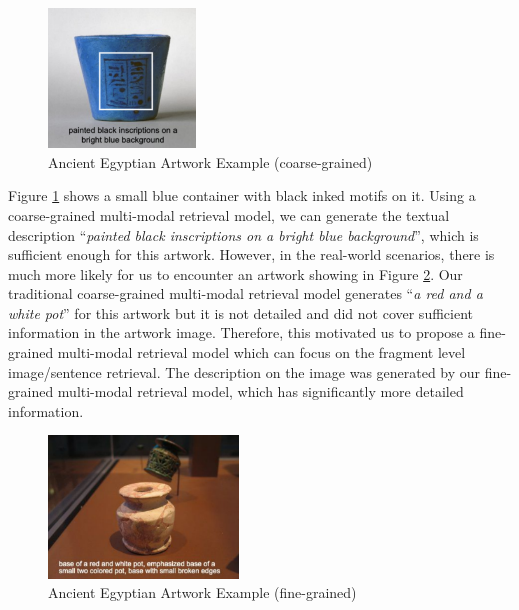 \begin{figure}[h!]
\centering
\includegraphics[width=0.35\textwidth]{artwork_fine1.pdf}
\caption{Ancient Egyptian Artwork Example (coarse-grained)}
\label{fig:artwork1}
\end{figure}

Figure \ref{fig:artwork1} shows a small blue container with black inked motifs on it. Using a coarse-grained multi-modal retrieval model, we can generate the textual description ``\textit{painted black inscriptions on a bright blue background}'', which is sufficient enough for this artwork. However, in the real-world scenarios, there is much more likely for us to encounter an artwork showing in Figure \ref{fig:artwork2}. Our traditional coarse-grained multi-modal retrieval model generates ``\textit{a red and a white pot}'' for this artwork but it is not detailed and did not cover sufficient information in the artwork image. Therefore, this motivated us to propose a fine-grained multi-modal retrieval model which can focus on the fragment level image/sentence retrieval. The description on the image was generated by our fine-grained multi-modal retrieval model, which has significantly more detailed information.

\begin{figure}[h!]
\centering
\includegraphics[width=0.45\textwidth]{artwork_fine2.pdf}
\caption{Ancient Egyptian Artwork Example (fine-grained)}
\label{fig:artwork2}
\end{figure}


